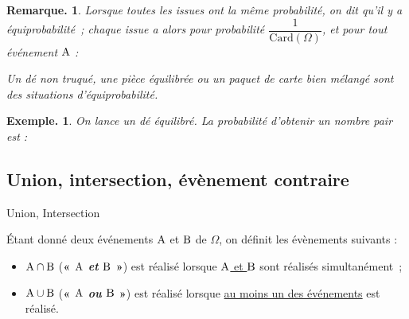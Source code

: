 \documentclass[12pt]{article}
\theoremstyle{break}
\newtheorem*{example}{Exemple.}
\newtheorem*{remark}{Remarque.}
\begin{document}
\begin{remark}
  Lorsque toutes les issues ont la même probabilité, on dit qu'il y a \emph{équiprobabilité}~; chaque issue a alors pour probabilité $\dfrac{1}{\mathrm{Card}(\Omega)}$, et pour tout événement $\mathrm{A}$ :
  
  \vspace{0.2em}
  \framebox[1\linewidth]{\parbox{5.5in}{%
  \[
  \hideMW{\P(\A) = \frac{\mathrm{Card}(\A)}{\mathrm{Card}(\Omega)} = \frac{\text{nombre d'issues favorables à } \A}{\text{nombre d'issues possibles}}.}
  \]
  \vspace{-1em}
  }}
  Un dé non truqué, une pièce équilibrée ou un paquet de carte bien mélangé sont des situations d'équiprobabilité.
\end{remark}
 
\begin{example}
  On lance un dé équilibré. La probabilité d'obtenir un nombre pair est :

  \vspace{0.2em}
  \framebox[1\linewidth]{\parbox{5.5in}{%
  \[
  \hideMW{\P(\text{« pair »}) = \frac{\mathrm{Card}(\{2,4,6\})}{\mathrm{Card}(\Omega)} = \frac{3}{6} = 0{,}5.}
  \]
  \vspace{-1em}
  }}
\end{example}
 
\subsection{Union, intersection, évènement contraire}
 
\begin{definition}{Union, Intersection}{}
\begin{multihide}
Étant donné deux événements $\mathrm{A}$ et $\mathrm{B}$ de $\Omega$, on définit les évènements suivants :
\begin{itemize}
  \item $\mathrm{A}\cap \mathrm{B}$ (\textbf{« $\mathrm{A}$ \emph{et} $\mathrm{B}$ »}) est réalisé lorsque \underline{$\mathrm{A}$ et $\mathrm{B}$} sont réalisés simultanément~;
  \item $\mathrm{A}\cup \mathrm{B}$ (\textbf{« $\mathrm{A}$ \emph{ou} $\mathrm{B}$ »}) est réalisé lorsque \underline{au moins un des événements} est réalisé.
\end{itemize}
\end{multihide}
\end{definition}
 
\end{document}
